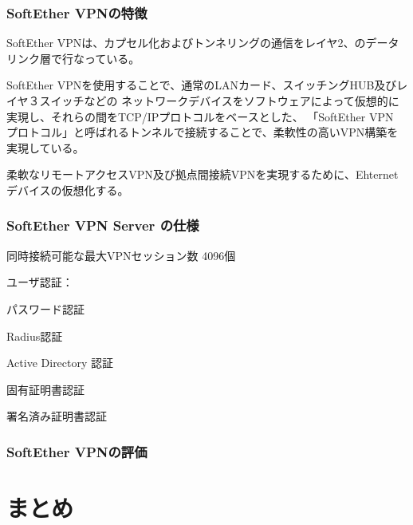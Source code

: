 \documentclass[12pt,a4paper,titlepage]{jsarticle}
\begin{document}
\subsubsection*{SoftEther VPNの特徴}
SoftEther VPNは、カプセル化およびトンネリングの通信をレイヤ2、のデータリンク層で行なっている。

SoftEther VPNを使用することで、通常のLANカード、スイッチングHUB及びレイヤ３スイッチなどの
ネットワークデバイスをソフトウェアによって仮想的に実現し、それらの間をTCP/IPプロトコルをベースとした、
「SoftEther VPN プロトコル」と呼ばれるトンネルで接続することで、柔軟性の高いVPN構築を実現している。


柔軟なリモートアクセスVPN及び拠点間接続VPNを実現するために、Ehternetデバイスの仮想化する。

\subsubsection*{SoftEther VPN Server の仕様}

同時接続可能な最大VPNセッション数
4096個





ユーザ認証：

パスワード認証

Radius認証

Active Directory 認証

固有証明書認証

署名済み証明書認証






\subsubsection*{SoftEther VPNの評価}




\section{まとめ}




\end{document}
